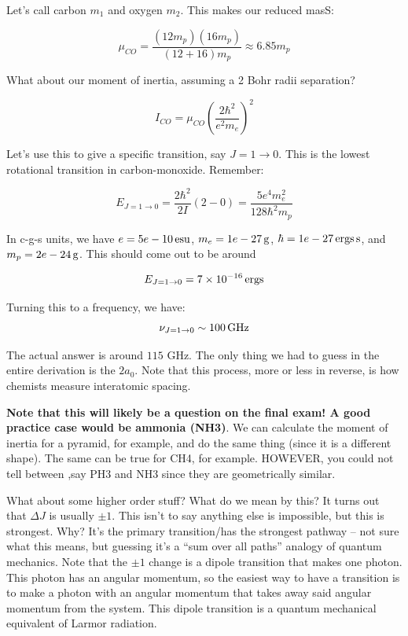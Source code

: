 \documentclass{article}
\newcommand{\unit}[1]{{\,\rm #1}}
\newcommand{\be}{\begin{equation}}
\newcommand{\ee}{\end{equation}}
\newcommand{\ergs}{\unit{ergs}}
\newcommand{\s}{\unit{s}}
\begin{document}
Let's call carbon $m_1$ and oxygen $m_2$. This makes our reduced masS:

\be
 \mu_{CO} = \frac{\left(12 m_p \right) \left(16 m_p \right)}{\left(12+16\right) m_p} \approx 6.85 m_p
\ee


What about our moment of inertia, assuming a 2 Bohr radii separation? 

\be
I_{CO} = \mu_{CO} \left(\frac{2\hbar^2}{e^2 m_e}\right)^2
\ee

Let's use this to give a specific transition, say $J=1\rightarrow0$. This is the lowest rotational transition in carbon-monoxide. Remember:

\be
E_{J=1\rightarrow0} = \frac{2\hbar^2}{2I}\left(2 - 0\right) = \frac{5e^4 m_e^2}{128\hbar^2 m_p}
\ee

In c-g-s units, we have $e = 5e-10 \unit{esu}$, $m_e = 1e-27 \unit{g}$, $\hbar = 1e-27 \ergs \s$, and $m_p = 2e-24 \unit{g}$. This should come out to be around 

\be
E_{J=1\rightarrow0} = 7 \times 10^{-16} \ergs
\ee

Turning this to a frequency, we have:
\be
\nu_{J=1\rightarrow0} \sim 100 \unit{GHz}
\ee

The actual answer is around $115$ GHz. The only thing we had to guess in the entire derivation is the $2 a_0$. Note that this process, more or less in reverse, is how chemists measure interatomic spacing. 

{\large \textbf{Note that this will likely be a question on the final exam! A good practice case would be ammonia (NH3)}}. We can calculate the moment of inertia for a pyramid, for example, and do the same thing (since it is a different shape). The same can be true for CH4, for example. HOWEVER, you could not tell between ,say PH3 and NH3 since they are geometrically similar. 

What about some higher order stuff? What do we mean by this? It turns out that $\Delta J$ is usually $\pm 1$. This isn't to say anything else is impossible, but this is strongest. Why? It's the primary transition/has the strongest pathway -- not sure what this means, but guessing it's a ``sum over all paths'' analogy of quantum mechanics. Note that the $\pm 1$ change is a dipole transition that makes one photon. This photon has an angular momentum, so the easiest way to have a transition is to make a photon with an angular momentum that takes away said angular momentum from the system. This dipole transition is a quantum mechanical equivalent of Larmor radiation. 
\end{document}
